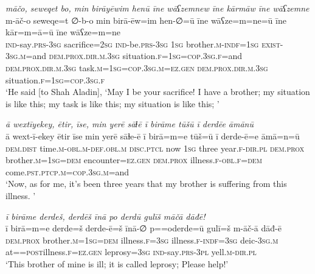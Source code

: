 \ea \label{DG.34}
\textit{māčo, seweqet bo, min birāyēwim henū īne wāʕzemnew īne kārmāw īne wāʕzemne} \\ 
\gll m-āč-o seweqe=t ∅-b-o min birā-ēw=im hen-∅=ū īne wāʕze=m=ne=ū īne kār=m=ā=ū īne wāʕze=m=ne \\ 
 \textsc{ind-}say\textsc{.prs}\textsc{-3sg} sacrifice\textsc{=\textsc{2sg}} \textsc{ind-}be\textsc{.prs}\textsc{-3sg} \textsc{1sg} brother\textsc{.m}\textsc{-indf}\textsc{=1sg} \textsc{exist}\textsc{-3sg}\textsc{.m}=and \textsc{dem.prox}\textsc{.dir}\textsc{.m}\textsc{.3sg} situation\textsc{\textsc{.f}}\textsc{=1sg}\textsc{=\textsc{cop.3sg\textsc{.f}}}=and \textsc{dem.prox}\textsc{.dir}\textsc{.m}\textsc{.3sg} task\textsc{.m}\textsc{=1sg}\textsc{=cop}\textsc{.3sg}\textsc{.m}\textsc{=ez}\textsc{.gen} \textsc{dem.prox}\textsc{.dir}\textsc{.m}\textsc{.3sg} situation\textsc{\textsc{.f}}\textsc{=1sg}\textsc{=\textsc{cop.3sg\textsc{.f}}} \\ 
\glt `He said [to Shah Aladin], ‘May I be your sacrifice! I have a brother; my situation is like this; my task is like this; my situation is like this; '
\z 
 
\ea \label{DG.38}
\textit{ā wextīyekey, ētir, īse, min yerē sāɫē ī birāme tūšū ī derdēe āmānū} \\ 
\gll ā wext-ī-ekey ētir īse min yerē sāɫe-ē ī birā=m=e tūš=ū ī derde-ē=e āmā=n=ū \\ 
 \textsc{dem.dist} time\textsc{.m}\textsc{-obl}\textsc{.m}\textsc{-def}\textsc{.obl}\textsc{.m} \textsc{disc.ptcl} now \textsc{1sg} three year\textsc{\textsc{.f}}\textsc{-dir}\textsc{.pl} \textsc{dem.prox} brother\textsc{.m}\textsc{=1sg}\textsc{=dem} encounter\textsc{=ez}\textsc{.gen} \textsc{dem.prox} illness\textsc{\textsc{.f}}\textsc{-obl}\textsc{\textsc{.f}}\textsc{=dem} come\textsc{.pst}\textsc{.ptcp}\textsc{.m}\textsc{=cop}\textsc{.3sg}\textsc{.m}=and \\ 
\glt `Now, as for me, it’s been three years that my brother is suffering from this illness. '
\z 
 
\ea \label{DG.43}
\textit{ī birāme derdeš, derdēš īnā po derdū gulīš māčā dāđē!} \\ 
\gll ī birā=m=e derde=š derde-ē=š īnā-∅ p==oderde=ū gulī=š m-āč-ā dāđ-ē \\ 
 \textsc{dem.prox} brother\textsc{.m}\textsc{=1sg}\textsc{=dem} illness\textsc{\textsc{.f}}\textsc{=3sg} illness\textsc{\textsc{.f}}\textsc{-indf}\textsc{=3sg} deic\textsc{-3sg}\textsc{.m} at=\textsc{=\textsc{post}}illness\textsc{\textsc{.f}}\textsc{=ez}\textsc{.gen} leprosy\textsc{=3sg} \textsc{ind-}say\textsc{.prs}\textsc{-3pl} yell\textsc{.m}\textsc{-dir}\textsc{.pl} \\ 
\glt `This brother of mine is ill; it is called leprosy; Please help!'
\z 
 

